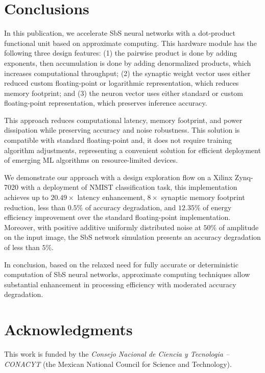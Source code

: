 \section{Conclusions}
\label{sec:conclusions}
In this publication, we accelerate SbS neural networks with a dot-product functional unit based on approximate computing.
This hardware module has the following three design features: (1) the pairwise product is done by adding exponents, then accumulation is done by adding denormalized products, which increases computational throughput; (2) the synaptic weight vector uses either reduced custom floating-point or logarithmic representation, which reduces memory footprint; and (3) the neuron vector uses either standard or custom floating-point representation, which preserves inference accuracy.

This approach reduces computational latency, memory footprint, and power dissipation while preserving accuracy and noise robustness. This solution is compatible with standard floating-point and, it does not require training algorithm adjustments, representing a convenient solution for efficient deployment of emerging ML algorithms on resource-limited devices.

We demonstrate our approach with a design exploration flow on a Xilinx Zynq-7020 with a deployment of NMIST classification task, this implementation achieves up to $20.49\times$ latency enhancement, $8\times$ synaptic memory footprint reduction, less than $0.5\%$ of accuracy degradation, and $12.35\%$ of energy efficiency improvement over the standard floating-point implementation. Moreover, with positive additive uniformly distributed noise at $50\%$ of amplitude on the input image, the SbS network simulation presents an accuracy degradation of less than $5\%$.

In conclusion, based on the relaxed need for fully accurate or deterministic computation of SbS neural networks, approximate computing techniques allow substantial enhancement in processing efficiency with moderated accuracy degradation.

\section * {Acknowledgments}\label{sec:Ack}
This work is funded by the \textit{Consejo Nacional de Ciencia y Tecnologia -- CONACYT} (the Mexican National Council for Science and Technology).
